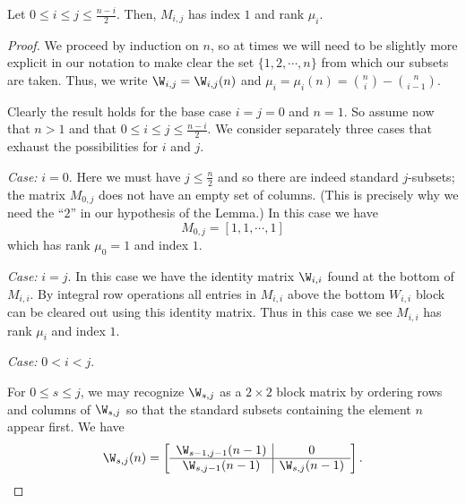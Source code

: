 \begin{lemma}\label{l:mind1}
Let $0 \leq i \leq j \leq \frac{n-i}{2}$.  Then, $M_{i,j}$ has index $1$ and rank $\mu_i$.
\end{lemma}
\begin{proof}
We proceed by induction on $n$, so at times we will need to be slightly more explicit in our notation to make clear the set $\{1, 2, \cdots , n\}$ from which our subsets are taken.  Thus, we write $\W_{i,j} = \W_{i,j}(n)$ and $\mu_{i} = \mu_{i}(n) = \binom{n}{i} - \binom{n}{i-1}$.  

Clearly the result holds for the base case $i=j=0$ and $n=1$.  So assume now that $n>1$ and that $0 \leq i \leq j \leq \frac{n-i}{2}$.  We consider separately three cases that exhaust the possibilities for $i$ and $j$.

\textit{Case:} $i=0$.  Here we must have $j \leq \frac{n}{2}$ and so there are indeed standard $j$-subsets; \ie the matrix $M_{0,j}$ does not have an empty set of columns. (This is precisely why we need the ``$2$'' in our hypothesis of the Lemma.)  In this case we have
\[
M_{0,j} = [1, 1, \cdots, 1]
\]
which has rank $\mu_{0} = 1$ and index $1$.

\textit{Case:} $i = j$.  In this case we have the identity matrix $\W_{i,i}$ found at the bottom of $M_{i,i}$.  By integral row operations all entries in $M_{i,i}$ above the bottom $W_{i,i}$ block can be cleared out using this identity matrix.  Thus in this case we see $M_{i,i}$ has rank $\mu_{i}$ and index $1$.

\textit{Case:}  $0<i<j$.  

For $0 \leq s \leq j$, we may recognize $\W_{s,j}$ as a $2 \times 2$ block matrix by ordering rows and columns of $\W_{s,j}$ so that the standard subsets containing the element $n$ appear first.  We have  
\[
\W_{s,j}(n) = 
\left [ \begin{array}{c|c}
\W_{s-1,j-1}(n-1) & 0 \\
\hline
\W_{s,j-1}(n-1) & \W_{s,j}(n-1)
\end{array} \right ].
\]


\end{proof}
